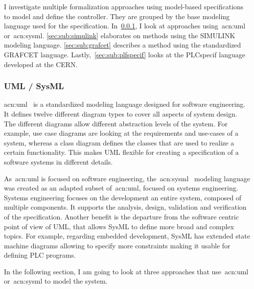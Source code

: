 I investigate multiple formalization approaches using model-based specifications to model and define the controller.
They are grouped by the base modeling language used for the specification.
In~\ref{sec:sub:uml}, I look at approaches using~\acrshort{acn:uml} or~\acrlong{acn:sysml}.
\ref{sec:sub:simulink} elaborates on methods using the SIMULINK modeling language.
\ref{sec:sub:grafcet} describes a method using the standardized GRAFCET language.
Lastly,~\ref{sec:sub:plfspecif} looks at the PLCspecif language developed at the CERN.

\subsubsection{UML / SysML}
\label{sec:sub:uml}

\acrfull{acn:uml}~\cite{UML:2-5-1} is a standardized modeling language designed for software engineering.
It defines twelve different diagram types to cover all aspects of system design.
The different diagrams allow different abstraction levels of the system.
For example, use case diagrams are looking at the requirements and use-cases of a system, whereas a class diagram defines the classes that are used to realize a certain functionality.
This makes UML flexible for creating a specification of a software systems in different details.

As~\acrshort{acn:uml} is focused on software engineering, the~\acrfull{acn:sysml}~\cite{SysML:1-6} modeling language was created as an adapted subset of~\acrshort{acn:uml}, focused on systems engineering.
Systems engineering focuses on the development an entire system, composed of multiple components.
It supports the analysis, design, validation and verification of the specification.
Another benefit is the departure from the software centric point of view of UML, that allows SysML to define more broad and complex topics.
For example, regarding embedded development, SysML has extended state machine diagrams allowing to specify more constraints making it usable for defining PLC programs.

In the following section, I am going to look at three approaches that use~\acrshort{acn:uml} or~\acrshort{acn:sysml} to model the system.

